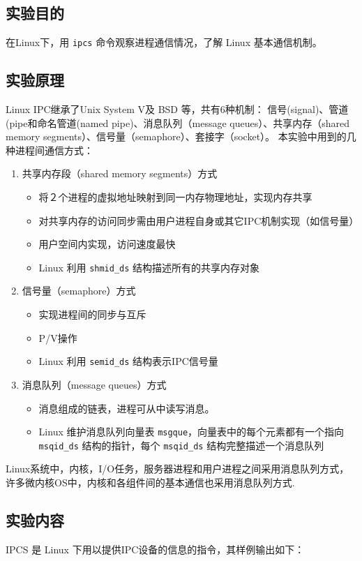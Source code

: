 \documentclass[blue,normal,cn]{elegantnote}
\newcommand{\code}[1]{\colorbox{light-gray}{\texttt{#1}}}
\begin{document}
\subsection{实验目的}
在Linux下，用 \code{ipcs} 命令观察进程通信情况，了解 Linux 基本通信机制。
\subsection{实验原理}
Linux IPC继承了Unix System V及 BSD 等，共有6种机制： 信号(signal)、管道(pipe和命名管道(named pipe)、消息队列（message queues）、共享内存（shared memory segments）、信号量（semaphore）、套接字（socket）。
本实验中用到的几种进程间通信方式：
\begin{enumerate}
  \item 共享内存段（shared memory segments）方式
  \begin{itemize}
    \item 将２个进程的虚拟地址映射到同一内存物理地址，实现内存共享
    \item 对共享内存的访问同步需由用户进程自身或其它IPC机制实现（如信号量）
    \item 用户空间内实现，访问速度最快
    \item Linux 利用 \code{shmid\_ds} 结构描述所有的共享内存对象
  \end{itemize}
  \item 信号量（semaphore）方式
  \begin{itemize}
    \item 实现进程间的同步与互斥
    \item P/V操作
    \item Linux 利用 \code{semid\_ds} 结构表示IPC信号量
  \end{itemize}
  \item 消息队列（message queues）方式
  \begin{itemize}
    \item 消息组成的链表，进程可从中读写消息。
    \item Linux 维护消息队列向量表 \code{msgque}，向量表中的每个元素都有一个指向 \code{msqid\_ds} 结构的指针，每个 \code{msqid\_ds} 结构完整描述一个消息队列
  \end{itemize}
\end{enumerate}

Linux系统中，内核，I/O任务，服务器进程和用户进程之间采用消息队列方式，许多微内核OS中，内核和各组件间的基本通信也采用消息队列方式.

\subsection{实验内容}
IPCS 是 Linux 下用以提供IPC设备的信息的指令，其样例输出如下：
\end{document}

